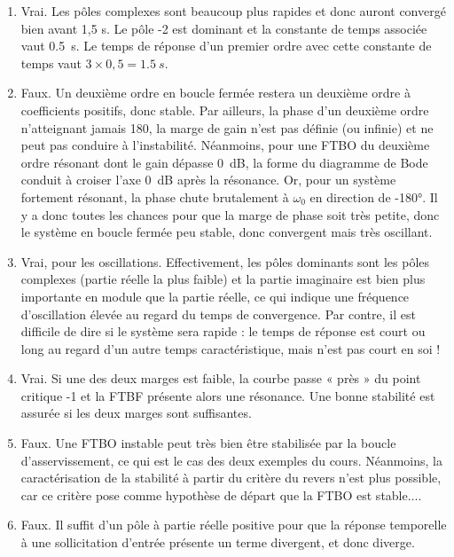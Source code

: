 \documentclass[10pt,fleqn]{article} %
\begin{document}
\fi

\ifprof
\begin{corrige}
\begin{enumerate}
\item Vrai. Les pôles complexes sont beaucoup plus rapides et donc auront convergé bien avant
1,5 s. Le pôle -2 est dominant et la constante de temps associée vaut \SI{0,5}{s}. Le temps de réponse
d’un premier ordre avec cette constante de temps vaut $3\times0,5 = \SI{1,5}{s}$.
\item Faux. Un deuxième ordre en boucle fermée restera un deuxième ordre à coefficients positifs,
donc stable. Par ailleurs, la phase d’un deuxième ordre n’atteignant jamais 180\degres, la marge de gain
n’est pas définie (ou infinie) et ne peut pas conduire à l’instabilité. Néanmoins, pour une FTBO
du deuxième ordre résonant dont le gain dépasse \SI{0}{dB}, la forme du diagramme de Bode conduit
à croiser l’axe \SI{0}{dB} après la résonance. Or, pour un système fortement résonant, la phase chute
brutalement à $\omega_0$ en direction de -180°. Il y a donc toutes les chances pour que la marge de phase
soit très petite, donc le système en boucle fermée peu stable, donc convergent mais très oscillant.
\item Vrai, pour les oscillations. Effectivement, les pôles dominants sont les pôles complexes (partie
réelle la plus faible) et la partie imaginaire est bien plus importante en module que la partie réelle,
ce qui indique une fréquence d’oscillation élevée au regard du temps de convergence. Par contre,
il est difficile de dire si le système sera rapide : le temps de réponse est court ou long au regard
d’un autre temps caractéristique, mais n’est pas court en soi !
\item Vrai. Si une des deux marges est faible, la courbe passe « près » du point critique -1 et la FTBF
présente alors une résonance. Une bonne stabilité est assurée si les deux marges sont suffisantes.
\item Faux. Une FTBO instable peut très bien être stabilisée par la boucle d’asservissement, ce qui
est le cas des deux exemples du cours. Néanmoins, la caractérisation de la
stabilité à partir du critère du revers n’est plus possible, car ce critère pose comme hypothèse de
départ que la FTBO est stable.... 
\item Faux. Il suffit d’un pôle à partie réelle positive pour que la réponse temporelle à une sollicitation
d’entrée présente un terme divergent, et donc diverge.
\end{enumerate}
\end{corrige}
\else
\fi
\end{document}

